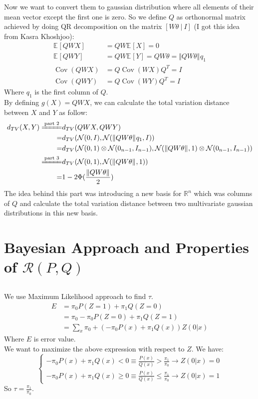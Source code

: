 \documentclass{article}
\numberwithin{equation}{section}
\newcommand{\EX}[2][]{\mathbb{E}_{#1}\left[#2\right]}%
\newcommand{\norm}[2][]{\Vert #2\Vert_{#1}}
\newcommand{\transpose}{^T}
\DeclareMathOperator*{\covariance}{Cov}
\newcommand{\Cov}[1]{\covariance\left(#1\right)}
\begin{document}
Now we want to convert them to gaussian distribution where all elements of their mean vector except the first one is zero.
So we define \(Q\) as orthonormal matrix achieved by doing QR decomposition on the matrix \(\left[ W\theta\ |\ I \right]\) (I got this idea from Kasra Khoshjoo):
\begin{align}
\EX{QWX} &= QW\EX{X} = 0\\
\EX{QWY} &= QW\EX{Y} = QW\theta = \norm{QW\theta}q_1\\
\Cov{QWX} &= Q \Cov{WX} Q\transpose = I\\
\Cov{QWY} &= Q \Cov{WY} Q\transpose = I
\end{align}
Where \(q_1\) is the first column of \(Q\).\\
By defining \(g(X) = QWX\), we can calculate the total variation distance between \(X\) and \(Y\) as follow:
\begin{align}
d_{TV}(X, Y) \xlongequal{\text{part 2}}& d_{TV}(QWX, QWY)\\
=& d_{TV}(\mathcal{N}(0, I), \mathcal{N}(\norm{QW\theta}q_1, I))\\
=& d_{TV}(\mathcal{N}(0, 1)\otimes \mathcal{N}(0_{n-1}, I_{n-1}), \mathcal{N}(\norm{QW\theta}, 1)\otimes \mathcal{N}(0_{n-1}, I_{n-1}))\\
\xlongequal{\text{part 3}}& d_{TV}(\mathcal{N}(0, 1), \mathcal{N}(\norm{QW\theta}, 1))\\
=& 1 - 2\Phi(\frac{\norm{QW\theta}}{2})
\end{align}
The idea behind this part was introducing a new basis for \(\mathbb{R}^n\) which was columns of \(Q\) and calculate the total variation distance between two multivariate gaussian distributions in this new basis.

\section{Bayesian Approach and Properties of \(\mathcal{R}(P, Q)\)}
\subsection{}
We use Maximum Likelihood approach to find \(\tau\).
\begin{align}
E &= \pi_0 P(Z=1) + \pi_1 Q(Z=0)\\
&= \pi_0 - \pi_0 P(Z=0) + \pi_1 Q(Z=1)\\
&= \sum_x \pi_0 + (-\pi_0 P(x) + \pi_1 Q(x))Z(0|x)
\end{align}
Where \(E\) is error value.\\
We want to maximize the above expression with respect to \(Z\).
We have:
\begin{equation}
\begin{cases}
-\pi_0 P(x) + \pi_1 Q(x) < 0 \equiv \frac{P(x)}{Q(x)} > \frac{\pi_1}{\pi_0} \rightarrow Z(0|x) = 0\\
-\pi_0 P(x) + \pi_1 Q(x) \ge 0 \equiv \frac{P(x)}{Q(x)} \le \frac{\pi_1}{\pi_0} \rightarrow Z(0|x) = 1
\end{cases}
\end{equation}
So \(\tau = \frac{\pi_1}{\pi_0}\).
\end{document}
